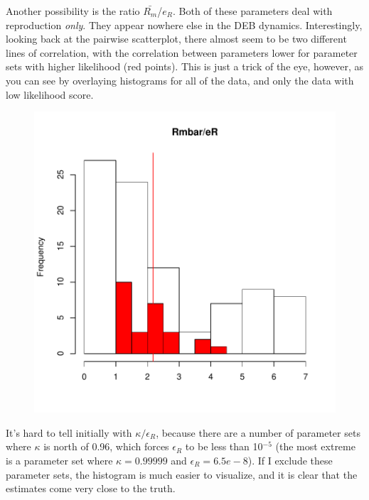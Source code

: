 \documentclass[12pt,reqno,final]{amsart}
\theoremstyle{plain}
\numberwithin{equation}{part}
\begin{document}
Another possibility is the ratio $\bar{R_m}$/$e_R$. Both of these
parameters deal with reproduction \emph{only}. They appear nowhere
else in the DEB dynamics. Interestingly, looking back at the pairwise
scatterplot, there almost seem to be two different lines of
correlation, with the correlation between parameters lower for
parameter sets with higher likelihood (red points). This is just a
trick of the eye, however, as you can see by overlaying histograms for
all of the data, and only the data with low likelihood score.


\begin{figure}
\includegraphics{Solving_the_problem_of_parameter_covariation-007}
\end{figure}

It's hard to tell initially with $\kappa/\epsilon_R$, because there
are a number of parameter sets where $\kappa$ is north of 0.96, which
forces $\epsilon_R$ to be less than 10$^{-5}$ (the most extreme is
a parameter set where $\kappa=0.99999$ and $\epsilon_R=6.5e-8$). If I
exclude these parameter sets, the histogram is much easier to
visualize, and it is clear that the estimates come very close to the truth.
\end{document}
